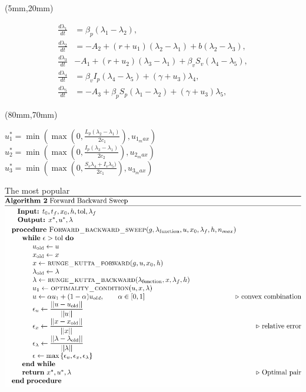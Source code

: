 
\begin{frame}
	\begin{textblock*}{80mm}(5mm,20mm)
		\begin{graybox}{}
			\begin{align*}
			\frac{d\lambda_1}{dt} &=\beta_p (\lambda_1-\lambda_2),\\
			\frac{d\lambda_2}{dt} &=-A_2+(r+u_1)(\lambda_2-\lambda_1)+b(\lambda_2-\lambda_3),\\
			\frac{d\lambda_3}{dt} &-A_1+(r+u_2)(\lambda_3-\lambda_1)+\beta_vS_v(\lambda_4-\lambda_5),\\
			\frac{d\lambda_4}{dt} &=\beta_v I_p(\lambda_4-\lambda_5)+(\gamma+u_3)\lambda_4,\\
			\frac{d\lambda_5}{dt} &=-A_3+\beta_p S_p(\lambda_1-\lambda_2)+(\gamma+u_3)\lambda_5,				
			\end{align*}
		\end{graybox}	
	\end{textblock*}

	\begin{textblock*}{60mm}(80mm,70mm)
		\begin{greenbox}{}
			$u_1^*=\min\left(\max\left(0,\frac{L_p(\lambda_2-\lambda_1)}{2c_1}\right),u_{1_max}\right)$
			$u_2^*=\min\left(\max\left(0,\frac{I_p(\lambda_3-\lambda_1)}{2c_2}\right),u_{2_max}\right)$
			$u_3^*=\min\left(\max\left(0,\frac{S_v\lambda_4+I_v\lambda_5)}{2c_1}\right),u_{3_max}\right)$
		\end{greenbox}
		
	\end{textblock*}

\end{frame}


\begin{frame}{The most popular}
	\includegraphics[width=1\linewidth]{Feathergraphics/fbs_algorithm.pdf}
\end{frame}
